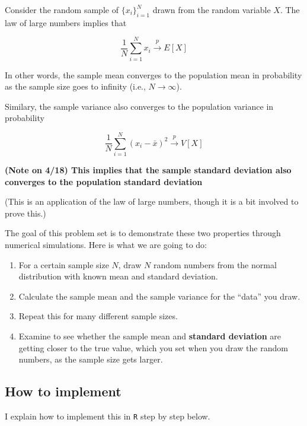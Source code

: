 \documentclass[]{book}
\providecommand{\tightlist}{%
  \setlength{\itemsep}{0pt}\setlength{\parskip}{0pt}}
\begin{document}
Consider the random sample of \(\{x_{i}\}_{i=1}^{N}\) drawn from the
random variable \(X\). The law of large numbers implies that

\[
\frac{1}{N}\sum_{i=1}^{N}x_{i}\overset{p}{\longrightarrow}E[X]
\]

In other words, the sample mean converges to the population mean in
probability as the sample size goes to infinity (i.e.,
\(N \rightarrow \infty\)).

Similary, the sample variance also converges to the population variance
in probability

\[
\frac{1}{N}\sum_{i=1}^{N}(x_{i}-\bar{x})^{2}\overset{p}{\longrightarrow}V[X]
\]

\textbf{(Note on 4/18) This implies that the sample standard deviation
also converges to the population standard deviation}

(This is an application of the law of large numbers, though it is a bit
involved to prove this.)

The goal of this problem set is to demonstrate these two properties
through numerical simulations. Here is what we are going to do:

\begin{enumerate}
\def\labelenumi{\arabic{enumi}.}
\tightlist
\item
  For a certain sample size \(N\), draw \(N\) random numbers from the
  normal distribution with known mean and standard deviation.
\item
  Calculate the sample mean and the sample variance for the ``data'' you
  draw.
\item
  Repeat this for many different sample sizes.
\item
  Examine to see whether the sample mean and \textbf{standard deviation}
  are getting closer to the true value, which you set when you draw the
  random numbers, as the sample size gets larger.
\end{enumerate}

\subsection{How to implement}\label{how-to-implement}

I explain how to implement this in \texttt{R} step by step below.
\end{document}
